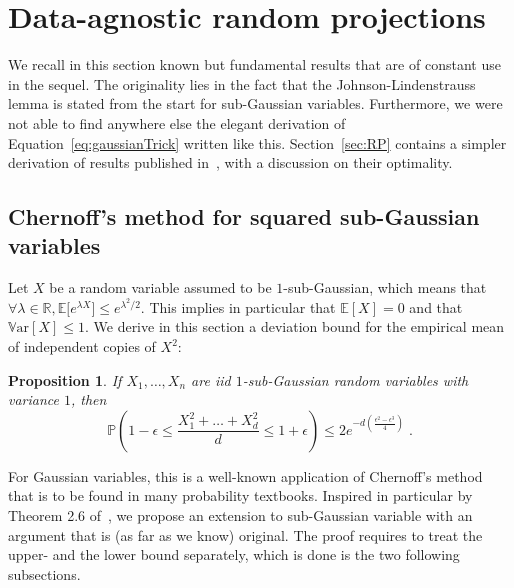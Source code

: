 \documentclass{ps}
\def\R{\mathbb{R}}
\renewcommand{\P}{\mathbb{P}}
\newcommand{\E}{\mathbb{E}}
\newcommand{\Var}{\mathbb{V}\!\mathrm{ar}}
\newcommand{\1}{\mathbbm{1}}
\theoremstyle{plain}
\newtheorem{proposition}{Proposition}
\begin{document}
\section{Data-agnostic random projections}\label{sec:data-agnostic}
We recall in this section known but fundamental results that are of constant use in the sequel. The originality lies in the fact that the Johnson-Lindenstrauss lemma is stated from the start for sub-Gaussian variables. Furthermore, we were not able to find anywhere else the elegant derivation of Equation~\eqref{eq:gaussianTrick} written like this. Section~\ref{sec:RP} contains a simpler derivation of results published in~\cite{Achlioptas01}, with a discussion on their optimality.
\subsection{Chernoff's method for squared sub-Gaussian variables}\label{sec:chernoff}
Let $X$ be a random variable  assumed to be $1$-sub-Gaussian, which means that $\forall \lambda\in\R, \E\big[e^{\lambda X}\big]\leq e^{\lambda^2/2}$. 
This implies in particular that $\E[X] = 0$ and that $\Var[X]\leq 1$. We derive in this section a deviation bound for the empirical mean of independent copies of $X^2$:
\begin{proposition}\label{prop:devX2}
If $X_1,\dots,X_n$ are iid $1$-sub-Gaussian random variables with variance $1$, then 
\[\P\left(1-\epsilon \leq \frac{X_1^2+\dots+X_d^2}{d}\leq 1+\epsilon\right)\leq 2 e^{-d\left(\frac{\epsilon^2 - \epsilon^3}{4} \right)} 
\;.\]
\end{proposition}

For Gaussian variables, this is a well-known application of Chernoff's method that is to be found in many probability textbooks. Inspired in particular by Theorem 2.6 of~\cite{wainwright_2019}, we propose an extension to sub-Gaussian variable with an argument that is (as far as we know) original. The proof requires to treat the upper- and the lower bound separately, which is done is the two following subsections.
\end{document}
